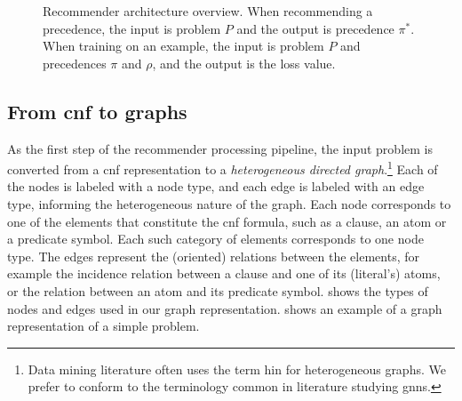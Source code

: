 \begin{figure}[h]
\caption{Recommender architecture overview.
When recommending a precedence, the input is problem $P$ and the output is precedence $\pi^*$.
When training on an example, the input is problem $P$ and precedences $\pi$ and $\rho$,
and the output is the loss value.}
\label{fig:architecture}
\centering
{}
\end{figure}

\subsection{From \gls{cnf} to graphs}

As the first step of the recommender processing pipeline,
the input problem is converted from a \gls{cnf} representation
to a \emph{heterogeneous directed graph}.\footnote{Data mining literature often uses the term \gls{hin} \cite{Shi2015} for heterogeneous graphs.
We prefer to conform to the terminology common in literature studying \glspl{gnn}.}
Each of the nodes is labeled with a node type,
and each edge is labeled with an edge type,
informing the heterogeneous nature of the graph.
Each node corresponds to one of the elements that constitute the \gls{cnf} formula,
such as a clause, an atom or a predicate symbol.
Each such category of elements corresponds to one node type.
The edges represent the (oriented) relations between the elements,
for example the incidence relation between a clause and one of its (literal's) atoms,
or the relation between an atom and its predicate symbol.
 shows the types of nodes and edges used in our graph representation.
 shows an example of a graph representation of a simple problem.

